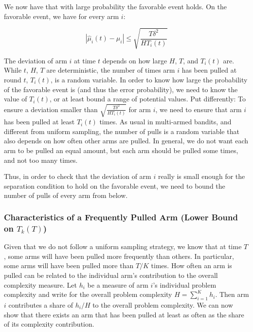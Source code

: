 \documentclass[11pt,]{article}
\begin{document}
We now have that with large probability the favorable event holds. On
the favorable event, we have for every arm \(i\):

\[
| \hat{\mu}_i(t) - \mu_i| \leq \sqrt{\frac{T\delta^2}{HT_i(t)}}
\]

The deviation of arm \(i\) at time \(t\) depends on how large \(H\),
\(T\), and \(T_i(t)\) are. While \(t\), \(H\), \(T\) are deterministic,
the number of times arm \(i\) has been pulled at round \(t\),
\(T_i(t)\), is a random variable. In order to know how large the
probability of the favorable event is (and thus the error probability),
we need to know the value of \(T_i(t)\), or at least bound a range of
potential values. Put differently: To ensure a deviation smaller than
\(\sqrt{\frac{T\delta^2}{HT_i(t)}}\) for arm \(i\), we need to ensure
that arm \(i\) has been pulled at least \(T_i(t)\) times. As usual in
multi-armed bandits, and different from uniform sampling, the number of
pulls is a random variable that also depends on how often other arms are
pulled. In general, we do not want each arm to be pulled an equal
amount, but each arm should be pulled some times, and not too many
times.

Thus, in order to check that the deviation of arm \(i\) really is small
enough for the separation condition to hold on the favorable event, we
need to bound the number of pulls of every arm from below.

\subsubsection{\texorpdfstring{Characteristics of a Frequently Pulled
Arm (Lower Bound on
\(T_k(T)\))}{Characteristics of a Frequently Pulled Arm (Lower Bound on T\_k(T))}}\label{characteristics-of-a-frequently-pulled-arm-lower-bound-on-t_kt}

Given that we do not follow a uniform sampling strategy, we know that at
time \(T\), some arms will have been pulled more frequently than others.
In particular, some arms will have been pulled more than \(T/K\) times.
How often an arm is pulled can be related to the individual arm's
contribution to the overall complexity measure. Let \(h_i\) be a measure
of arm \(i\)'s individual problem complexity and write for the overall
problem complexity \(H = \sum_{i = 1}^{K} h_i\). Then arm \(i\)
contributes a share of \(h_i/H\) to the overall problem complexity. We
can now show that there exists an arm that has been pulled at least as
often as the share of its complexity contribution.
\end{document}
